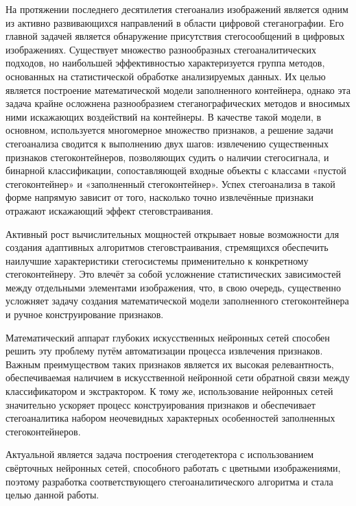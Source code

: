 

На протяжении последнего десятилетия стегоанализ изображений является одним из активно развивающихся направлений в области цифровой стеганографии. Его главной задачей является обнаружение присутствия стегосообщений в цифровых изображениях. Существует множество разнообразных стегоаналитических подходов, но наибольшей эффективностью характеризуется группа методов, основанных на статистической обработке анализируемых данных. Их целью является построение математической модели заполненного контейнера, однако эта задача крайне осложнена разнообразием стеганографических методов и вносимых ними искажающих воздействий на контейнеры. В качестве такой модели, в основном, используется многомерное множество признаков, а решение задачи стегоанализа сводится к выполнению двух шагов: извлечению существенных признаков стегоконтейнеров, позволяющих судить о наличии стегосигнала, и бинарной классификации, сопоставляющей входные объекты с классами «пустой стегоконтейнер» и «заполненный стегоконтейнер». Успех стегоанализа в такой форме напрямую зависит от того, насколько точно извлечённые признаки отражают искажающий эффект стеговстраивания.

Активный рост вычислительных мощностей открывает новые возможности для создания адаптивных алгоритмов стеговстраивания, стремящихся обеспечить наилучшие характеристики стегосистемы применительно к конкретному стегоконтейнеру. Это влечёт за собой усложнение статистических зависимостей между отдельными элементами изображения, что, в свою очередь, существенно усложняет задачу создания математической модели заполненного стегоконтейнера и ручное конструирование признаков.

Математический аппарат глубоких искусственных нейронных сетей способен решить эту проблему путём автоматизации процесса извлечения признаков. Важным преимуществом таких признаков является их высокая релевантность, обеспечиваемая наличием в искусственной нейронной сети обратной связи между классификатором и экстрактором. К тому же, использование нейронных сетей значительно ускоряет процесс конструирования признаков и обеспечивает стегоаналитика набором неочевидных характерных особенностей заполненных стегоконтейнеров.

Актуальной является задача построения стегодетектора с использованием свёрточных нейронных сетей, способного работать с цветными изображениями, поэтому разработка соответствующего стегоаналитического алгоритма и стала целью данной работы.

